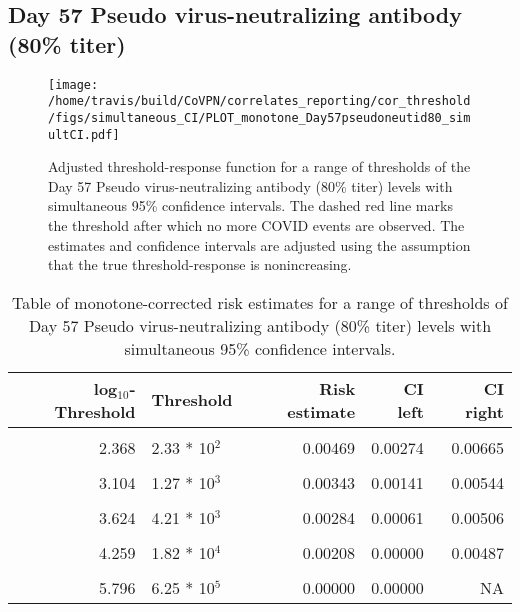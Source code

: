 \documentclass[]{book}
\theoremstyle{definition}
\theoremstyle{definition}
\theoremstyle{definition}
\newcommand{\1}{\mathbbm{1}}
\begin{document}
\newpage

\newpage

\newpage

\hypertarget{day-57-pseudo-virus-neutralizing-antibody-80-titer-3}{%
\subsection{Day 57 Pseudo virus-neutralizing antibody (80\% titer)}\label{day-57-pseudo-virus-neutralizing-antibody-80-titer-3}}

\begin{figure}[H]
\centering
\texttt{[image: /home/travis/build/CoVPN/correlates\_reporting/cor\_threshold/figs/simultaneous\_CI/PLOT\_monotone\_Day57pseudoneutid80\_simultCI.pdf]}
\caption{Adjusted threshold-response function for a range of thresholds of the
  Day 57 Pseudo virus-neutralizing antibody (80\% titer) levels with simultaneous 95\% confidence intervals. The dashed red line marks the threshold after which no more COVID events are observed. The estimates and confidence intervals are adjusted using the assumption that the true threshold-response is nonincreasing.}
\end{figure}
\begin{table}[!h]

\caption{\label{tab:unnamed-chunk-401}Table of monotone-corrected risk estimates for a range of thresholds of Day 57 Pseudo virus-neutralizing antibody (80\% titer) levels with simultaneous 95\% confidence intervals.}
\centering
\begin{tabular}[t]{rlrrr}
\toprule
log$_{10}$-Threshold & Threshold & Risk estimate & CI left & CI right\\
\midrule
\cellcolor{gray!6}{1.289} & \cellcolor{gray!6}{1.95 * 10$^1$} & \cellcolor{gray!6}{0.00514} & \cellcolor{gray!6}{0.00323} & \cellcolor{gray!6}{0.00706}\\
2.368 & 2.33 * 10$^2$ & 0.00469 & 0.00274 & 0.00665\\
\cellcolor{gray!6}{2.755} & \cellcolor{gray!6}{5.69 * 10$^2$} & \cellcolor{gray!6}{0.00428} & \cellcolor{gray!6}{0.00229} & \cellcolor{gray!6}{0.00626}\\
3.104 & 1.27 * 10$^3$ & 0.00343 & 0.00141 & 0.00544\\
\cellcolor{gray!6}{3.373} & \cellcolor{gray!6}{2.36 * 10$^3$} & \cellcolor{gray!6}{0.00312} & \cellcolor{gray!6}{0.00108} & \cellcolor{gray!6}{0.00516}\\
3.624 & 4.21 * 10$^3$ & 0.00284 & 0.00061 & 0.00506\\
\cellcolor{gray!6}{3.909} & \cellcolor{gray!6}{8.11 * 10$^3$} & \cellcolor{gray!6}{0.00243} & \cellcolor{gray!6}{0.00013} & \cellcolor{gray!6}{0.00473}\\
4.259 & 1.82 * 10$^4$ & 0.00208 & 0.00000 & 0.00487\\
\cellcolor{gray!6}{4.676} & \cellcolor{gray!6}{4.74 * 10$^4$} & \cellcolor{gray!6}{0.00208} & \cellcolor{gray!6}{0.00000} & \cellcolor{gray!6}{0.00657}\\
5.796 & 6.25 * 10$^5$ & 0.00000 & 0.00000 & NA\\
\bottomrule
\end{tabular}
\end{table}
\end{document}
